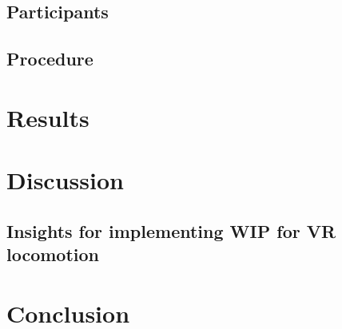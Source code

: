 \documentclass[manuscript,review,anonymous]{acmart}
\begin{document}


\subsection{Participants}

\subsection{Procedure}


\section{Results}


\section{Discussion}

\subsection{Insights for implementing WIP for VR locomotion}


\section{Conclusion}


\end{document}
